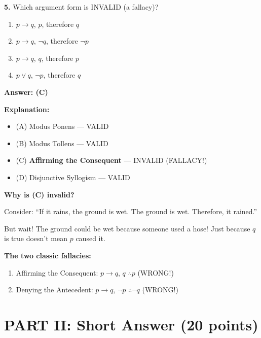 \documentclass[11pt,a4paper]{article}
\begin{document}
\vspace{10pt}

\textbf{5.} Which argument form is INVALID (a fallacy)?

\begin{enumerate}[label=(\Alph*),noitemsep]
    \item $p \to q$, $p$, therefore $q$
    \item $p \to q$, $\neg q$, therefore $\neg p$
    \item $p \to q$, $q$, therefore $p$
    \item $p \lor q$, $\neg p$, therefore $q$
\end{enumerate}

\begin{solnbox}
\textbf{Answer: (C)}

\textbf{Explanation:}
\begin{itemize}[noitemsep]
    \item (A) Modus Ponens --- VALID
    \item (B) Modus Tollens --- VALID
    \item (C) \textbf{Affirming the Consequent} --- INVALID (FALLACY!)
    \item (D) Disjunctive Syllogism --- VALID
\end{itemize}

\textbf{Why is (C) invalid?}

Consider: ``If it rains, the ground is wet. The ground is wet. Therefore, it rained.''

But wait! The ground could be wet because someone used a hose! Just because $q$ is true doesn't mean $p$ caused it.

\textbf{The two classic fallacies:}
\begin{enumerate}[noitemsep]
    \item Affirming the Consequent: $p \to q$, $q$ $\therefore p$ (WRONG!)
    \item Denying the Antecedent: $p \to q$, $\neg p$ $\therefore \neg q$ (WRONG!)
\end{enumerate}
\end{solnbox}

\newpage

\section*{PART II: Short Answer (20 points)}
\end{document}
